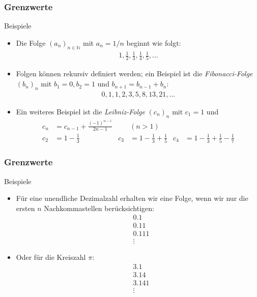 \documentclass{beamer}
\renewcommand{\emph}[1]{{\textcolor{solarizedRed}{\itshape #1}}}
\newcommand\NN{\mathbb N}
\renewcommand{\oe}{\"o}
\newcommand{\ue}{\"u}
\newcommand{\mytitle}{Grenzwerte}
\begin{document}
\begin{frame}\frametitle{\mytitle}
	\begin{block}{Beispiele}
		\begin{itemize}
			\item Die Folge $(a_n)_{n\in\NN}$ mit $a_n=1/n$ beginnt wie folgt:
				\begin{align*}
				1,\frac{1}{2},\frac{1}{3},\frac{1}{4},\frac{1}{5},\ldots
				\end{align*}
			\item Folgen k\oe nnen rekursiv definiert werden; ein Beispiel ist die \emph{Fibonacci-Folge} $(b_n)_n$ mit $b_1=0,b_2=1$ und $b_{n+1}=b_{n-1}+b_n$:
				\begin{align*}
				0,1,1,2,3,5,8,13,21,\ldots
				\end{align*}
			\item Ein weiteres Beispiel ist die \emph{Leibniz-Folge} $(c_n)_n$ mit $c_1=1$ und
				\begin{align*}
					c_{n}&=c_{n-1}+\frac{(-1)^{n-1}}{2n-1}&&(n>1)\\
					c_2&=1-\frac{1}{3}&
					c_3&=1-\frac{1}{3}+\frac{1}{5}&
					c_4&=1-\frac{1}{3}+\frac{1}{5}-\frac{1}{7}
				\end{align*}
		\end{itemize}
	\end{block}
\end{frame}

\begin{frame}\frametitle{\mytitle}
	\begin{block}{Beispiele}
		\begin{itemize}
			\item F\ue r eine unendliche Dezimalzahl erhalten wir eine Folge, wenn wir nur die ersten $n$ Nachkommastellen ber\ue cksichtigen:
				\begin{align*}
				&0.1\\
				&0.11\\
				&0.111\\
				&\vdots
				\end{align*}
			\item Oder f\ue r die Kreiszahl $\pi$:
				\begin{align*}
				&3.1\\
				&3.14\\
				&3.141\\
				&\vdots
				\end{align*}
		\end{itemize}
	\end{block}
\end{frame}
\end{document}
